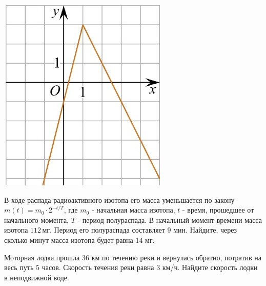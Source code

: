 \begin{class}[number=6]
\begin{listofex}
			\begin{minipage}[c]{0.11\textwidth}
				\includegraphics[align=t, width=\textwidth]{../../pics/G111M4C5-3.jpg}
			\end{minipage}
			\item В ходе распада радиоактивного изотопа его масса уменьшается по закону \( m(t)=m_0\cdot2^{-t/T} \), где \( m_0 \) - начальная масса изотопа,  \( t \) - время, прошедшее от начального момента, \( T \) - период полураспада. В начальный момент времени масса изотопа \( 112 \) мг. Период его полураспада составляет \( 9  \) мин. Найдите, через сколько минут масса изотопа будет равна \( 14  \) мг.
			\item Моторная лодка прошла \( 36 \) км по течению реки и вернулась обратно, потратив на весь путь \( 5 \) часов. Скорость течения реки равна \( 3 \) км/ч. Найдите скорость лодки в неподвижной воде.
		\end{listofex}
	\end{class}
	
